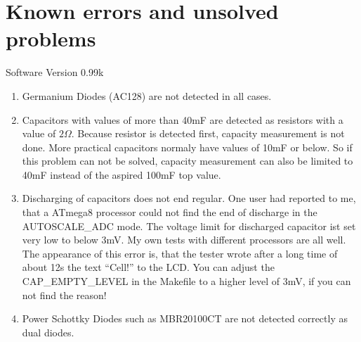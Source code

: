 
\chapter{Known errors and unsolved problems}
{\center Software Version 0.99k}

\begin{enumerate}
\item Germanium Diodes (AC128) are not detected in all cases.
\item Capacitors with values of more than 40mF are detected as resistors with a value of \(2\Omega\).
Because resistor is detected first, capacity measurement is not done. More practical capacitors normaly have
values of 10mF or below. So if this problem can not be solved, capacity measurement can also be limited to
40mF instead of the aspired 100mF top value.
\item Discharging of capacitors does not end regular. One user had reported to me, that a ATmega8 processor could not
find the end of discharge in the AUTOSCALE\_ADC mode.
The voltage limit for discharged capacitor ist set very low to below 3mV. My own tests with different processors are all well.
The appearance of this error is, that the tester wrote after a long time of about 12s the text ``Cell!'' to the LCD.
You can adjust the CAP\_EMPTY\_LEVEL in the Makefile to a higher level of 3mV, if you can not find the reason!
\item Power Schottky Diodes such as MBR20100CT are not detected correctly as dual diodes.

\end{enumerate}
